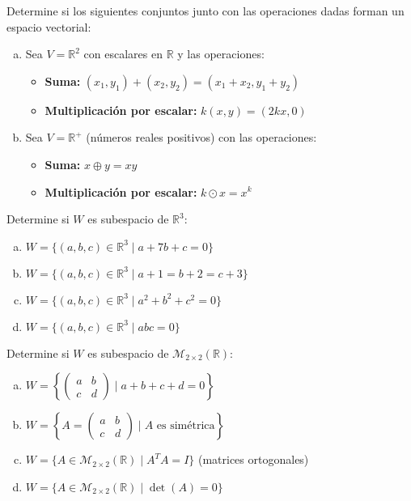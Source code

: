 \begin{prob} Determine si los siguientes conjuntos junto con las operaciones dadas forman un espacio vectorial:

\begin{enumerate}[(a)]
\item Sea $V = \mathbb{R}^2$ con escalares en $\mathbb{R}$ y las operaciones:
\begin{itemize}
\item \textbf{Suma:} $(x_1,y_1) + (x_2,y_2) = (x_1+x_2, y_1+y_2)$
\item \textbf{Multiplicación por escalar:} $k(x,y) = (2kx, 0)$
\end{itemize}

\item Sea $V = \mathbb{R}^+$ (números reales positivos) con las operaciones:
\begin{itemize}
\item \textbf{Suma:} $x \oplus y = xy$
\item \textbf{Multiplicación por escalar:} $k \odot x = x^k$
\end{itemize}
\end{enumerate}
\end{prob}



\begin{prob} Determine si $W$ es subespacio de $\mathbb{R}^3$:
\begin{enumerate}[(a)]
\item $W = \{(a,b,c) \in \mathbb{R}^3 \mid a + 7b + c = 0\}$
\item $W = \{(a,b,c) \in \mathbb{R}^3 \mid a + 1 = b + 2 = c + 3\}$
\item $W = \{(a,b,c) \in \mathbb{R}^3 \mid a^2 + b^2 + c^2 = 0\}$
\item $W = \{(a,b,c) \in \mathbb{R}^3 \mid abc = 0\}$
\end{enumerate}
\end{prob}

\begin{prob} Determine si $W$ es subespacio de $\mathcal{M}_{2 \times 2}(\mathbb{R})$:
\begin{enumerate}[(a)]
\item $W = \left\{\begin{pmatrix} a & b \\ c & d \end{pmatrix} \mid a + b + c + d = 0\right\}$
\item $W = \left\{A = \begin{pmatrix} a & b \\ c & d \end{pmatrix} \mid A \text{ es simétrica}\right\}$
\item $W = \{A \in \mathcal{M}_{2 \times 2}(\mathbb{R}) \mid A^TA = I\}$ (matrices ortogonales)
\item $W = \{A \in \mathcal{M}_{2 \times 2}(\mathbb{R}) \mid \det(A) = 0\}$
\end{enumerate}
\end{prob}

